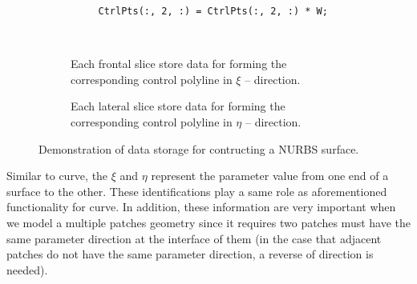 \begin{itemize}
\begin{itemize}
\begin{lstlisting}
                CtrlPts(:, 2, :) = CtrlPts(:, 2, :) * W;
            \end{lstlisting}
            \begin{figure}[H]
                \centering
                \normalsize
                \\
                \begin{subfigure}[b]{0.3\textwidth}
                        \normalsize
                        
                        \caption{Each frontal slice store data for forming the corresponding control polyline in $\xi$ -- direction.}
                        \label{Ch3FrontalSlicesCylinder}
                    \end{subfigure}
                    \qquad \qquad \qquad \qquad
                    \begin{subfigure}[b]{0.3\textwidth}
                        
                        \caption{Each lateral slice store data for forming the corresponding control polyline in $\eta$ -- direction.}
                        \label{fig:Ch3LateralSlicesCylinder}
                    \end{subfigure}
                \caption{Demonstration of data storage for contructing a NURBS surface.}
                \label{fig:Ch3SurfAQuarterOfACylinder}
            \end{figure}
            Similar to curve, the $\xi$ and $\eta$ represent the parameter value from one end of a surface to the other. These identifications play a same role as aforementioned functionality for curve. In addition, these information are very important when we model a multiple patches geometry since it requires two patches must have the same parameter direction at the interface of them (in the case that adjacent patches do not have the same parameter direction, a reverse of direction is needed).


\end{itemize}
\end{itemize}
